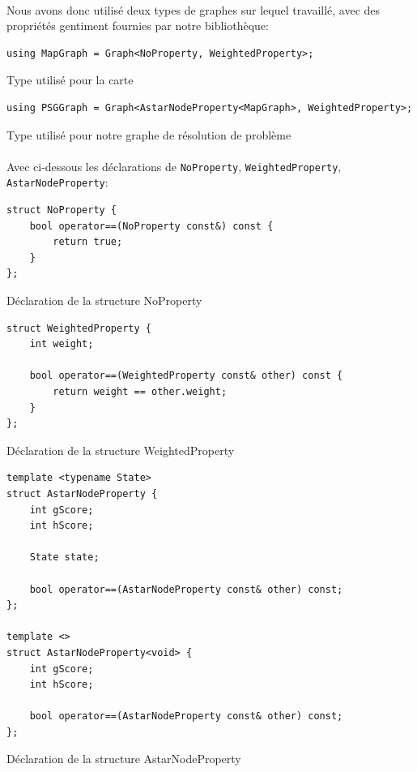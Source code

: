 \documentclass[french]{article}
\begin{document}
\paragraph{} Nous avons donc utilisé deux types de graphes sur lequel
travaillé, avec des propriétés gentiment fournies par notre bibliothèque:

\begin{listing}[H]
\begin{verbatim}
using MapGraph = Graph<NoProperty, WeightedProperty>;
\end{verbatim}
\caption{Type utilisé pour la carte}
\label{tsp:map}
\end{listing}

\begin{listing}[H]
\begin{verbatim}
using PSGGraph = Graph<AstarNodeProperty<MapGraph>, WeightedProperty>;
\end{verbatim}
\caption{Type utilisé pour notre graphe de résolution de problème}
\label{tsp:psg}
\end{listing}

\paragraph{} Avec ci-dessous les déclarations de \texttt{NoProperty},
\texttt{WeightedProperty}, \texttt{AstarNodeProperty}:

\begin{listing}[H]
\begin{verbatim}
struct NoProperty {
	bool operator==(NoProperty const&) const {
		return true;
	}
};
\end{verbatim}
\caption{Déclaration de la structure NoProperty}
\label{tsp:psg}
\end{listing}

\begin{listing}[H]
\begin{verbatim}
struct WeightedProperty {
	int weight;

	bool operator==(WeightedProperty const& other) const {
		return weight == other.weight;
	}
};
\end{verbatim}
\caption{Déclaration de la structure WeightedProperty}
\label{tsp:psg}
\end{listing}

\begin{listing}[H]
\begin{verbatim}
template <typename State>
struct AstarNodeProperty {
	int gScore;
	int hScore;

	State state;

	bool operator==(AstarNodeProperty const& other) const;
};

template <>
struct AstarNodeProperty<void> {
	int gScore;
	int hScore;

	bool operator==(AstarNodeProperty const& other) const;
};
\end{verbatim}
\caption{Déclaration de la structure AstarNodeProperty}
\label{tsp:psg}
\end{listing}
\end{document}
